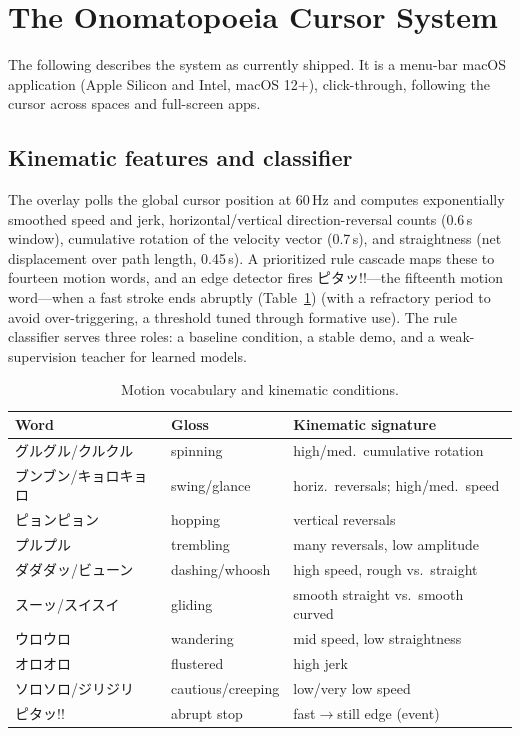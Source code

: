 \documentclass[sigconf,nonacm]{acmart}
\newcommand{\jp}[1]{#1}
\begin{document}
\section{The Onomatopoeia Cursor System}
\label{sec:system}

The following describes the system as currently shipped. It is a menu-bar macOS application (Apple Silicon and Intel, macOS 12+), click-through, following the cursor across spaces and full-screen apps.

\subsection{Kinematic features and classifier}
The overlay polls the global cursor position at 60\,Hz and computes exponentially smoothed speed and jerk, horizontal/vertical direction-reversal counts (0.6\,s window), cumulative rotation of the velocity vector (0.7\,s), and straightness (net displacement over path length, 0.45\,s). A prioritized rule cascade maps these to fourteen motion words, and an edge detector fires \jp{ピタッ!!}---the fifteenth motion word---when a fast stroke ends abruptly (Table~\ref{tab:words}) (with a refractory period to avoid over-triggering, a threshold tuned through formative use). The rule classifier serves three roles: a baseline condition, a stable demo, and a weak-supervision teacher for learned models.

\begin{table}[h]
  \caption{Motion vocabulary and kinematic conditions.}
  \label{tab:words}
  \footnotesize
  \setlength{\tabcolsep}{2.5pt}
  \begin{tabular}{lll}
    \toprule
    Word & Gloss & Kinematic signature \\
    \midrule
    \jp{グルグル}/\jp{クルクル} & spinning & high/med.\ cumulative rotation \\
    \jp{ブンブン}/\jp{キョロキョロ} & swing/glance & horiz.\ reversals; high/med.\ speed \\
    \jp{ピョンピョン} & hopping & vertical reversals \\
    \jp{プルプル} & trembling & many reversals, low amplitude \\
    \jp{ダダダッ}/\jp{ビューン} & dashing/whoosh & high speed, rough vs.\ straight \\
    \jp{スーッ}/\jp{スイスイ} & gliding & smooth straight vs.\ smooth curved \\
    \jp{ウロウロ} & wandering & mid speed, low straightness \\
    \jp{オロオロ} & flustered & high jerk \\
    \jp{ソロソロ}/\jp{ジリジリ} & cautious/creeping & low/very low speed \\
    \jp{ピタッ!!} & abrupt stop & fast$\rightarrow$still edge (event) \\
    \bottomrule
  \end{tabular}
\end{table}
\end{document}

